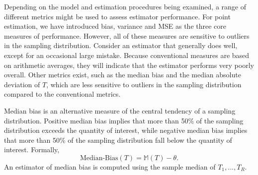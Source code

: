 \documentclass[
]{book}
\newcommand{\M}{\mathbb{M}}
\begin{document}
Depending on the model and estimation procedures being examined, a range of different metrics might be used to assess estimator performance.
For point estimation, we have introduced bias, variance and MSE as the three core measures of performance.
However, all of these measures are sensitive to outliers in the sampling distribution.
Consider an estimator that generally does well, except for an occasional large mistake. Because conventional measures are based on arithmetic averages, they will indicate that the estimator performs very poorly overall.
Other metrics exist, such as the median bias and the median absolute deviation of \(T\), which are less sensitive to outliers in the sampling distribution compared to the conventional metrics.

Median bias is an alternative measure of the central tendency of a sampling distribution.
Positive median bias implies that more than 50\% of the sampling distribution exceeds the quantity of interest, while negative median bias implies that more than 50\% of the sampling distribution fall below the quantity of interest.
Formally,
\[ 
\text{Median-Bias}(T) = \M(T) - \theta 
\label{eq:median-bias}.
\]
An estimator of median bias is computed using the sample median of \(T_1,...,T_R\).
\end{document}
